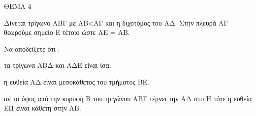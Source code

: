 
ΘΕΜΑ 4

Δίνεται τρίγωνο ΑΒΓ με ΑΒ\textless ΑΓ και η διχοτόμος του ΑΔ. Στην πλευρά ΑΓ θεωρούμε σημείο Ε τέτοιο ώστε ΑΕ = ΑΒ.

Να αποδείξετε ότι :

\begin{alist}
\item τα τρίγωνα ΑΒΔ και ΑΔΕ είναι ίσα. 

\item η ευθεία ΑΔ είναι μεσοκάθετος του τμήματος ΒΕ. 

\item αν το ύψος από την κορυφή Β του τριγώνου ΑΒΓ τέμνει την ΑΔ στο Η τότε η ευθεία ΕΗ είναι κάθετη στην ΑΒ. 


\end{alist}
